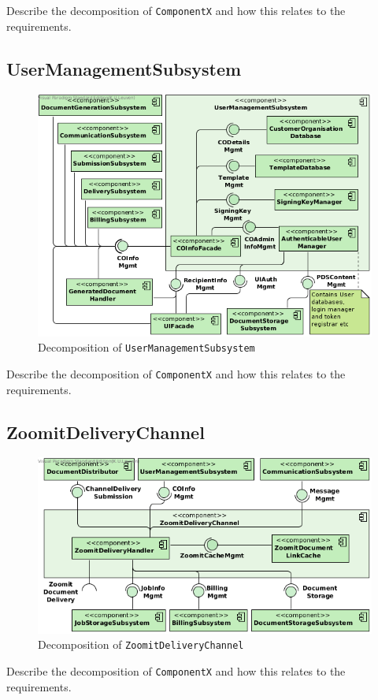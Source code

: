 Describe the decomposition of \texttt{ComponentX} and how this relates to the
requirements.

\subsection{UserManagementSubsystem}
\begin{figure}[!htp]
    \centering
    \includegraphics[width=\textwidth]{figures/User Managment Subsystem.png}
    \caption{Decomposition of \texttt{UserManagementSubsystem}}\label{fig:decomp-usersub}
\end{figure}

Describe the decomposition of \texttt{ComponentX} and how this relates to the
requirements.

\subsection{ZoomitDeliveryChannel}
\begin{figure}[!htp]
    \centering
    \includegraphics[width=\textwidth]{figures/ZoomitDeliveryChannel.png}
    \caption{Decomposition of \texttt{ZoomitDeliveryChannel}}\label{fig:decomp-zoomitchan}
\end{figure}

Describe the decomposition of \texttt{ComponentX} and how this relates to the
requirements.